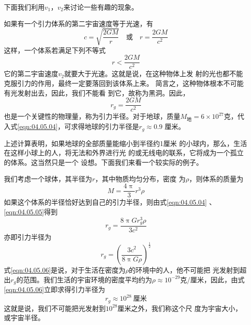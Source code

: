 下面我们利用$  v _ 1 $，$ v _ 2 $来讨论一些有趣的现象。

如果有一个引力体系的第二宇宙速度等于光速，有
\begin{equation*}
c = \sqrt { \frac { 2 G M } { r } } \quad  
\text{或} \quad
r = \frac { 2 G M } { c ^ { 2 } }  
\end{equation*}
这样，一个体系若满足下列不等式
\begin{equation*}
	r < \frac { 2 G M } { c ^ { 2 } }  
\end{equation*}
它的第二宇宙速度$ v_2 $就要大于光速。这就是说，在这种物体上发
射的光也都不能克服引力的作用，最终一定要落回到该体系上来。
简言之，这种物体根本不可能有光发射出去，因此，我们不能看
到它，故称为黑洞。因此，
\begin{equation}\label{eqn:04.05.04}
	r _ { g } = \frac { 2 G M } { c ^ { 2 } } 
\end{equation}
也是一个关键性的物理量，称为引力半径。对于地球，质量$ M _ { \text{地} }= 6 \times 1 0 ^ { 2 7 }  $克，代入式\eqref{eqn:04.05.04}，可求得地球的引力半径是$  r _ { g } \approx 0 . 9  $
厘米。

上述计算表明，如果地球的全部质量能缩小到半径约1厘米
的小球内，那么，生活在这样小球上的人，将无法和外界进行光
的或无线电的联系，它将成为一个孤立的体系。这当然只是一个
设想。下面我们来看一个较实际的例子。

我们考虑一个球体，其半径为$ r $，其中物质均匀分布，密度
为$ \rho $，则体系的质量为
\begin{equation}\label{eqn:04.05.05}
	M = \frac { 4 \uppi } { 3 } r ^ { 3 } \rho
\end{equation}
如果这个体系的半径恰好达到自己的引力半径，则由式\eqref{eqn:04.05.04} 、\eqref{eqn:04.05.05}得到
\begin{equation*}
	r _ { g } = \frac { 8 \uppi G r _ { g } ^ { 3 } \rho } { 3 c ^ { 2 } }  
\end{equation*}
亦即引力半径为
\begin{equation}\label{eqn:04.05.06}
	r _ { g } = \left( \frac { 3 c ^ { 2 } } { 8 \uppi G \rho } \right) ^ { \frac { 1 } { 2 } }  
\end{equation}
式\eqref{eqn:04.05.06}是说，对于生活在密度为$ \rho $的环境中的人，他不可能把
光发射到超出$ r_g $的范围。我们生活的宇宙环境的密度平均约为$ \rho
\approx 10 ^ {-29}$克/厘米，因此，由式\eqref{eqn:04.05.06}立即求得引力半径为
\begin{equation*}
r _ g \approx 10 ^ {28} ~\text{厘米}
\end{equation*}
这就是说，我们不可能把光发射到$ 10 ^ {28} $厘米之外，我们称这个尺
度为宇宙大小，或宇宙半径。